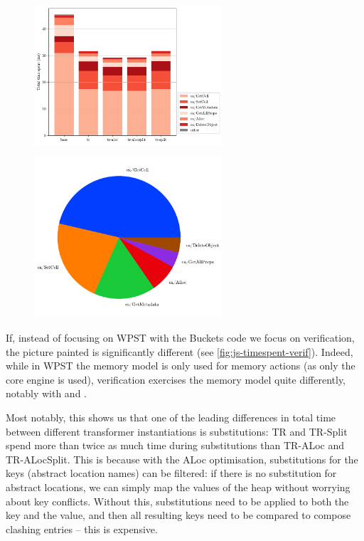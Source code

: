 \begin{figure}
\centering
\begin{minipage}[t]{.45\textwidth}
	\centering
	\includegraphics[width=7cm]{figures/js/buckets_time_spent_per_action_detailed.pdf}
	\label{fig:js-timespent-buckets}
\end{minipage}\hfill%
\begin{minipage}[t]{.45\textwidth}
	\centering
	\includegraphics[width=7cm]{figures/js/buckets_avg_action_call_count.pdf}
	\label{fig:js-callcount-buckets}
\end{minipage}%
\end{figure}

If, instead of focusing on WPST with the Buckets code we focus on verification, the picture painted is significantly different (see \autoref{fig:js-timespent-verif}). Indeed, while in WPST the memory model is only used for memory actions (as only the core engine is used), verification exercises the memory model quite differently, notably with \produce{} and \consume{}.

Most notably, this shows us that one of the leading differences in total time between different transformer instantiations is substitutions: TR and TR-Split spend more than twice as much time during substitutions than TR-ALoc and TR-ALocSplit. This is because with the ALoc optimisation, substitutions for the keys (abstract location names) can be filtered: if there is no substitution for abstract locations, we can simply map the values of the heap without worrying about key conflicts. Without this, substitutions need to be applied to both the key and the value, and then all resulting keys need to be compared to compose clashing entries -- this is expensive.

